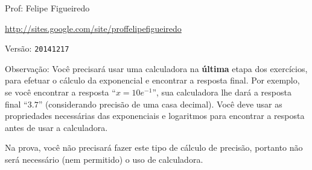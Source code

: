 \documentclass[a4paper]{article}
\begin{document}
\parbox[c]{.825\textwidth}{\raggedright%
{Prof: Felipe Figueiredo\par}
{\url{http://sites.google.com/site/proffelipefigueiredo}\par}
}

Versão: \verb|20141217|

\vspace{0.5cm}


Observação: Você precisará usar uma calculadora na {\bf última} etapa
dos exercícios, para efetuar o cálculo da exponencial e encontrar a
resposta final. Por exemplo, se você encontrar a resposta
``$x=10e^{-1}$'', sua calculadora lhe dará a resposta final ``$3.7$''
(considerando precisão de uma casa decimal). Você deve usar as
propriedades necessárias das exponenciais e logaritmos para encontrar
a resposta antes de usar a calculadora.

Na prova, você não precisará fazer este tipo de cálculo de precisão,
portanto não será necessário (nem permitido) o uso de calculadora.
\end{document}
